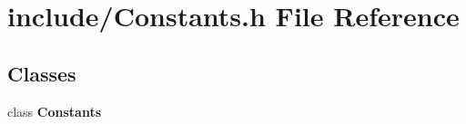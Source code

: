\section{include/\+Constants.h File Reference}
\label{_constants_8h}
\subsection*{Classes}
\begin{DoxyCompactItemize}
\item 
class \textbf{ Constants}
\end{DoxyCompactItemize}
